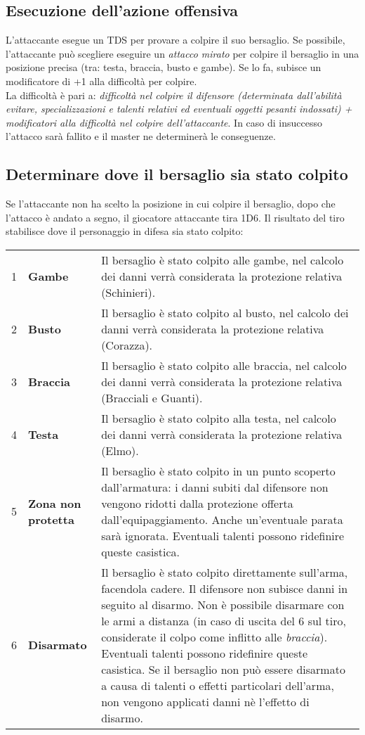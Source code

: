\documentclass[../manuale_main.tex]{subfiles}
\begin{document}
\subsection{Esecuzione dell'azione offensiva}
L'attaccante esegue un TDS per provare a colpire il suo bersaglio. Se possibile, l'attaccante può scegliere eseguire un \emph{attacco mirato} per colpire il bersaglio in una posizione precisa (tra: testa, braccia, busto e gambe). Se lo fa, subisce un modificatore di +1 alla difficoltà per colpire.\\ La difficoltà è pari a: \emph{difficoltà nel colpire il difensore (determinata dall'abilità \emph{evitare}, specializzazioni e talenti relativi ed eventuali oggetti pesanti indossati) + modificatori alla difficoltà nel colpire dell'attaccante}.
In caso di insuccesso l'attacco sarà fallito e il master ne determinerà le conseguenze.

\subsection{Determinare dove il bersaglio sia stato colpito}
Se l'attaccante non ha scelto la posizione in cui colpire il bersaglio, dopo che l'attacco è andato a segno, il giocatore attaccante tira 1D6. Il risultato del tiro stabilisce dove il personaggio in difesa sia stato colpito:\\
\renewcommand{\arraystretch}{1.5}
\begin{tabularx}{\linewidth}{|c| l X|}
\hline
1&\textbf{Gambe}&Il bersaglio è stato colpito alle gambe, nel calcolo dei danni verrà considerata la protezione relativa (Schinieri).\\
2&\textbf{Busto}&Il bersaglio è stato colpito al busto, nel calcolo dei danni verrà considerata la protezione relativa (Corazza).\\
3&\textbf{Braccia}&Il bersaglio è stato colpito alle braccia, nel calcolo dei danni verrà considerata la protezione relativa (Bracciali e Guanti).\\
4&\textbf{Testa}&Il bersaglio è stato colpito alla testa, nel calcolo dei danni verrà considerata la protezione relativa (Elmo).\\
5&\textbf{Zona non protetta}&Il bersaglio è stato colpito in un punto scoperto dall'armatura: i danni subiti dal difensore non vengono ridotti dalla protezione offerta dall'equipaggiamento. Anche un'eventuale parata sarà ignorata. Eventuali talenti possono ridefinire queste casistica.\\
6&\textbf{Disarmato}&Il bersaglio è stato colpito direttamente sull'arma, facendola cadere. Il difensore non subisce danni in seguito al disarmo. Non è possibile disarmare con le armi a distanza (in caso di uscita del 6 sul tiro, considerate il colpo come inflitto alle \emph{braccia}). Eventuali talenti possono ridefinire queste casistica. Se il bersaglio non può essere disarmato a causa di talenti o effetti particolari dell'arma, non vengono applicati danni nè l'effetto di disarmo.\\
\hline
\end{tabularx}
\end{document}
